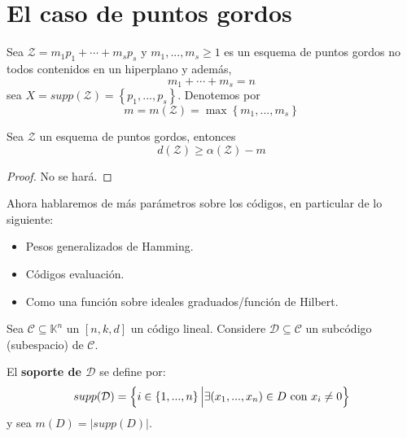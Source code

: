 \documentclass[12pt]{report}
\newcounter{it}
\theoremstyle{largebreak}
\newcommand\abs[1]{\ensuremath{\left|#1\right|}}
\begin{document}
    \section{El caso de puntos gordos}

    Sea $\mathcal{Z}=m_1p_1+\cdots+m_sp_s$ y $m_1,...,m_s\geq1$ es un esquema de puntos gordos no todos contenidos en un hiperplano y además,
    \begin{equation*}
        m_1+\cdots+m_s=n
    \end{equation*}
    sea $X=supp(\mathcal{Z})=\left\{p_1,...,p_s \right\}$. Denotemos por
    \begin{equation*}
        m=m(\mathcal{Z})=\max\left\{m_1,...,m_s \right\}
    \end{equation*}

    \begin{theor}
        Sea $\mathcal{Z}$ un esquema de puntos gordos, entonces
        \begin{equation*}
            d(\mathcal{Z})\geq\alpha(\mathcal{Z})-m
        \end{equation*}
    \end{theor}

    \begin{proof}
        No se hará.
    \end{proof}

    Ahora hablaremos de más parámetros sobre los códigos, en particular de lo siguiente:
    \begin{itemize}
        \item Pesos generalizados de Hamming.
        \item Códigos evaluación.
        \item Como una función sobre ideales graduados/función de Hilbert.
    \end{itemize}

    \begin{mydef}
        Sea $\mathcal{C}\subseteq\mathbb{K}^n$ un $[n,k,d]$ un código lineal. Considere $\mathcal{D}\subseteq\mathcal{C}$ un subcódigo (subespacio) de $\mathcal{C}$.

        El \textbf{soporte de $\mathcal{D}$} se define por:
        \begin{equation*}
            supp(\mathcal{D})=\left\{i\in\left\{1,...,n \right\}\Big|\exists (x_1,...,x_n)\in D\textup{ con }x_i\neq 0 \right\}
        \end{equation*}
        y sea $m(D)=\abs{supp(D)}$.
    \end{mydef}
\end{document}
